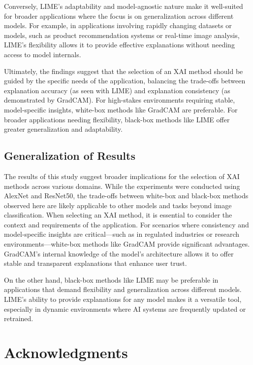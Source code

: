\documentclass{article}
\begin{document}
Conversely, LIME’s adaptability and model-agnostic nature make it well-suited for broader applications where the focus is on generalization across different models. For example, in applications involving rapidly changing datasets or models, such as product recommendation systems or real-time image analysis, LIME’s flexibility allows it to provide effective explanations without needing access to model internals.

Ultimately, the findings suggest that the selection of an XAI method should be guided by the specific needs of the application, balancing the trade-offs between explanation accuracy (as seen with LIME) and explanation consistency (as demonstrated by GradCAM). For high-stakes environments requiring stable, model-specific insights, white-box methods like GradCAM are preferable. For broader applications needing flexibility, black-box methods like LIME offer greater generalization and adaptability.

\subsection{Generalization of Results}

The results of this study suggest broader implications for the selection of XAI methods across various domains. While the experiments were conducted using AlexNet and ResNet50, the trade-offs between white-box and black-box methods observed here are likely applicable to other models and tasks beyond image classification.
When selecting an XAI method, it is essential to consider the context and requirements of the application. For scenarios where consistency and model-specific insights are critical—such as in regulated industries or research environments—white-box methods like GradCAM provide significant advantages. GradCAM’s internal knowledge of the model’s architecture allows it to offer stable and transparent explanations that enhance user trust.

On the other hand, black-box methods like LIME may be preferable in applications that demand flexibility and generalization across different models. LIME’s ability to provide explanations for any model makes it a versatile tool, especially in dynamic environments where AI systems are frequently updated or retrained.




\appendix

\section*{Acknowledgments}
\end{document}
